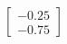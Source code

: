 \documentclass[preview]{standalone}
\begin{document}
\begin{align*}
\begin{bmatrix} -0.25 \\ -0.75 \end{bmatrix}
\end{align*}
\end{document}
